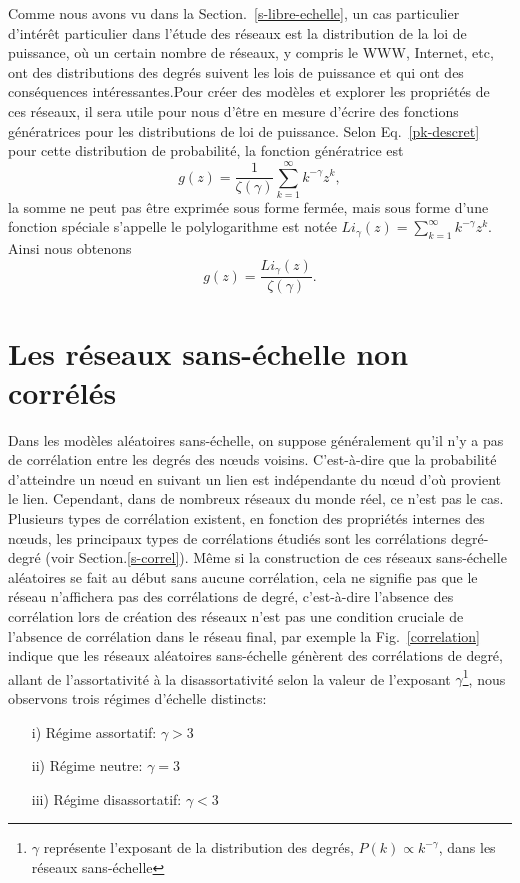 Comme nous avons vu dans la Section.~\ref{s-libre-echelle}, un cas particulier d'intérêt particulier dans l'étude des réseaux est la distribution de la loi de puissance, où un certain nombre de réseaux, y compris le WWW, Internet, etc, ont des distributions des degrés suivent les lois de puissance et qui ont des conséquences intéressantes.Pour créer des modèles et explorer les propriétés de ces réseaux, il sera utile pour nous d'être en mesure d'écrire des fonctions génératrices pour les distributions de loi de puissance.
Selon Eq.~\eqref{pk-descret} pour cette distribution de probabilité, la fonction génératrice est 
\begin{equation}
g(z)=\frac{1}{\zeta(\gamma)}\sum_{k=1}^{\infty}k^{-\gamma}z^{k},
\end{equation}
la somme ne peut pas être exprimée sous forme fermée, mais sous forme d'une fonction spéciale s'appelle le polylogarithme est notée
$Li_{\gamma}(z)=\sum_{k=1}^{\infty}k^{-\gamma}z^k$.\\
Ainsi nous obtenons
\begin{equation}
g(z)=\frac{Li_{\gamma}(z)}{\zeta(\gamma)}.
\end{equation}


\section{Les réseaux sans-échelle non corrélés}
Dans les modèles aléatoires sans-échelle, on suppose généralement qu'il n'y a pas de corrélation entre les degrés des nœuds voisins. C'est-à-dire que la probabilité d'atteindre un nœud en suivant un lien est indépendante du nœud d'où provient le lien. Cependant, dans de nombreux réseaux du monde réel, ce n'est pas le cas. Plusieurs types de corrélation existent, en fonction des propriétés internes des nœuds, les principaux types de corrélations étudiés sont les corrélations degré-degré (voir Section.\ref{s-correl}). Même si la construction de ces réseaux sans-échelle aléatoires se fait au début sans aucune corrélation, cela ne signifie pas que le réseau n'affichera pas des corrélations de degré, c'est-à-dire l'absence des corrélation lors de création des réseaux n'est pas une condition cruciale de l'absence de corrélation dans le réseau final, par exemple la Fig.~\ref{correlation} indique que les réseaux aléatoires sans-échelle génèrent des corrélations de degré, allant de l'assortativité à la disassortativité selon la valeur de l'exposant $\gamma$\footnote{$\gamma$ représente l'exposant de la distribution des degrés, $P(k)\propto k^{-\gamma}$, dans les réseaux sans-échelle }, nous observons trois régimes d'échelle distincts:
\begin{itemize}
	\item[i)] Régime assortatif: $\gamma>3$
	\item[ii)]Régime neutre: $\gamma=3$
	\item[iii)] Régime disassortatif: $\gamma<3$
\end{itemize}

